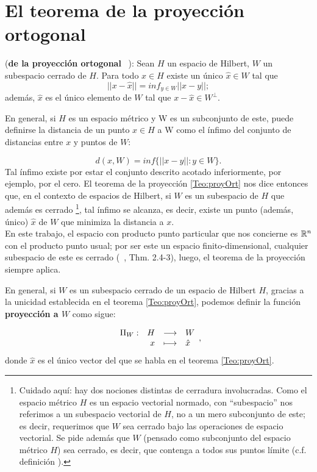 \section{El teorema de la proyección ortogonal}
\begin{teo} \label{Teo:proyOrt}
(\textbf{de la proyección ortogonal}
~\cite{Nimark}):
Sean $H$ un espacio de Hilbert, $W$ un subespacio cerrado de $H$. 
Para todo $x \in H$ existe un único $\hat{x} \in W $ tal que
\[
||x- \hat{x}|| = inf_{y \in W}|| x-y ||;
\]
además, $\hat{x}$ es el único elemento de $W$
tal que $x-\hat{x} \in W^{\perp} $.
\end{teo}


En general, si $H$ es un espacio métrico y W es un subconjunto
de este, puede definirse la distancia de un punto $x \in H$ a W como
el ínfimo del conjunto de distancias entre $x$ y puntos de $W$:

\[
d(x,W)=inf\{||x-y||: y \in W \}.
\]
\noindent 
Tal ínfimo existe por estar el conjunto descrito acotado inferiormente,
por ejemplo, por el cero. El teorema de la proyección 
\ref{Teo:proyOrt} nos dice entonces que,
en el contexto de espacios de Hilbert, si $W$ es un subespacio de $H$
que además es cerrado \footnote{Cuidado aquí: hay dos nociones distintas de 
cerradura involucradas. Como el espacio métrico $H$ es un espacio vectorial
normado, con ``subespacio'' nos referimos a un subespacio vectorial de $H$,
no a un mero subconjunto de este; es decir, requerimos que $W$ sea cerrado bajo
las operaciones de espacio vectorial. Se pide además que $W$ (pensado
como subconjunto del espacio métrico $H$) sea cerrado, es decir, que contenga
a todos sus puntos límite
(c.f. definición ).}, tal ínfimo se alcanza, es decir, existe un punto
(además, único) $\hat{x}$ de $W$ que minimiza la distancia a $x$. \\

En este trabajo, 
el espacio con producto punto
particular que nos concierne 
es $\mathbb{R}^{n}$ con el producto punto usual; por ser
este un espacio finito-dimensional, 
cualquier subespacio de este es cerrado
(~\cite{Kreyszig}, Thm. 2.4-3),
luego, el teorema de la proyección siempre aplica. 

En general, si $W$ es un subespacio cerrado de
un espacio de Hilbert $H$, gracias a la unicidad
establecida en el teorema \ref{Teo:proyOrt},
podemos definir la función \textbf{proyección a $W$}
como sigue:

\begin{equation}
\label{eq3: 1Dic}
\text{${\begin{array}{crcl} \Pi_{W}: & H & \longrightarrow & W \\ \, & x & \longmapsto & \hat{x} \end{array}}$},
\end{equation}
donde $\hat{x}$ es el único vector del que se habla
en el teorema \ref{Teo:proyOrt}.


